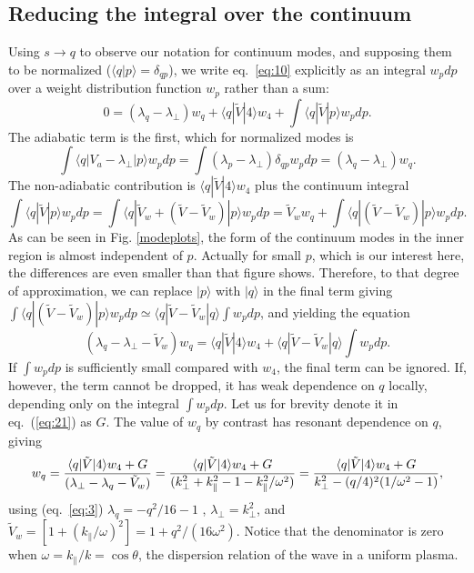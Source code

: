 \documentclass[12pt]{article}
\def\ket#1{|#1\rangle}
\def\bra#1{\langle#1}
\begin{document}
\subsection{Reducing the integral over the continuum}
\label{reducing}
Using $s\to q$ to observe our notation for continuum modes, and
supposing them to be normalized ($\bra{q}\ket{p}=\delta_{qp}$), we write eq.\
\ref{eq:10} explicitly as an integral $w_pdp$ over a
weight distribution function $w_p$ rather than a
sum:
\begin{equation}
  \label{continw}
  0=(\lambda_q-\lambda_\perp)w_q+\bra{q}|\tilde{V}\ket{4}w_4
  +\int\bra{q}|\tilde{V}\ket{p}w_pdp.
\end{equation}
The adiabatic term is the first, which for normalized modes is
\begin{equation}
  \label{eq:contadiab}
  \int\bra{q}|V_a-\lambda_\perp\ket{p}w_pdp = \int
  (\lambda_p-\lambda_\perp)\delta_{qp}w_pdp = (\lambda_q-\lambda_\perp)w_q.
\end{equation}
The non-adiabatic contribution is $\bra{q}|\tilde{V}\ket{4}w_4$ plus the
continuum integral
\begin{equation}
  \label{eq:18}
  \int \bra{q}|\tilde{V}\ket{p}w_pdp=\int\bra{q}|\tilde{V}_{w}+(\tilde{V}-\tilde{V}_{w})\ket{p}w_pdp
  =\tilde{V}_{w}w_q +\int\bra{q}|(\tilde{V}-\tilde{V}_{w})\ket{p}w_pdp.
\end{equation}
As can be seen in Fig. \ref{modeplots}, the form of the continuum
modes in the inner region is almost independent of $p$. Actually for
small $p$, which is our interest here, the differences are even
smaller than that figure shows. Therefore, to that degree of
approximation, we can replace $\ket{p}$ with $\ket{q}$ in the final
term giving $\int\bra{q}|(\tilde{V}-\tilde{V}_{w})\ket{p}w_pdp\simeq
\bra{q}|\tilde{V}-\tilde{V}_{w}\ket{q}\int w_pdp$, and yielding the
equation
\begin{equation}
  \label{eq:21}
  (\lambda_q-\lambda_\perp-\tilde V_w)w_q= \bra{q}|\tilde{V}\ket{4}w_4
  +\bra{q}|\tilde{V}-\tilde{V}_{w}\ket{q}\int w_pdp.
\end{equation}
If $\int w_pdp$ is sufficiently small compared with $w_4$, the final
term can be ignored.  If, however, the term cannot be dropped, it has
weak dependence on $q$ locally, depending only on the integral
$\int w_pdp$. Let us for brevity denote it in eq.\ (\ref{eq:21}) as
$G$. The value of $w_q$ by contrast has resonant dependence on $q$,
giving
\begin{equation}
  \label{eq:resonance}
  w_q = {\bra{q}|\tilde{V}\ket{4}w_4+G\over (\lambda_\perp-\lambda_q-\tilde{V}_{w})}
  ={\bra{q}|\tilde{V}\ket{4}w_4+G\over
    (k_\perp^2+k_\parallel^2-1-k_\parallel^2/\omega^2) }
  ={\bra{q}|\tilde{V}\ket{4}w_4+G\over k_\perp^2-(q/4)^2(1/\omega^2-1) },
\end{equation}
using (eq.\ \ref{eq:3}) $\lambda_q=-q^2/16-1$ , $\lambda_\perp=k_\perp^2$, and
$\tilde{V}_{w}=[1+(k_\parallel/\omega)^2]=1+q^2/(16\omega^2)$. Notice that the
denominator is zero when $\omega=k_\parallel/k=\cos\theta$, the
dispersion relation of the wave in a uniform plasma. 
\end{document}
